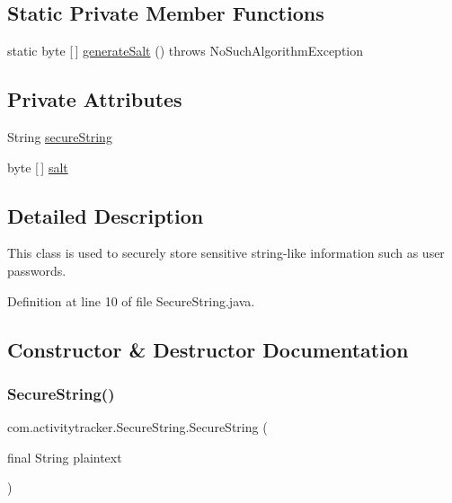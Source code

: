 \subsection*{Static Private Member Functions}
\begin{DoxyCompactItemize}
\item 
static byte \mbox{[}$\,$\mbox{]} \mbox{\hyperlink{classcom_1_1activitytracker_1_1_secure_string_a1907ad109bb5e64291fabd3ff459ef49}{generate\+Salt}} ()  throws No\+Such\+Algorithm\+Exception 
\end{DoxyCompactItemize}
\subsection*{Private Attributes}
\begin{DoxyCompactItemize}
\item 
String \mbox{\hyperlink{classcom_1_1activitytracker_1_1_secure_string_a1448f7b8865c6c57cc7218662ee7f1ee}{secure\+String}}
\item 
byte \mbox{[}$\,$\mbox{]} \mbox{\hyperlink{classcom_1_1activitytracker_1_1_secure_string_a8549ead1f186ff0c2520818b03d1cc21}{salt}}
\end{DoxyCompactItemize}


\subsection{Detailed Description}
This class is used to securely store sensitive string-\/like information such as user passwords. 

Definition at line 10 of file Secure\+String.\+java.



\subsection{Constructor \& Destructor Documentation}
\mbox{\label{classcom_1_1activitytracker_1_1_secure_string_a889fcbf0c1f771962ac81886f49e389e}} 
\subsubsection{\texorpdfstring{Secure\+String()}{SecureString()}\hspace{0.1cm}{\footnotesize\ttfamily [1/2]}}
{\footnotesize\ttfamily com.\+activitytracker.\+Secure\+String.\+Secure\+String (\begin{DoxyParamCaption}\item[{final String}]{plaintext }\end{DoxyParamCaption})\hspace{0.3cm}{\ttfamily [package]}}

